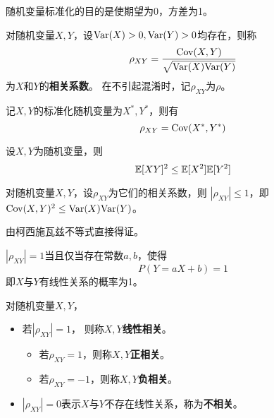 \begin{remark}
  随机变量标准化的目的是使期望为0，方差为1。
\end{remark}

\begin{definition}[相关系数]
  对随机变量$X,Y$，设$\textrm{Var}(X)>0,\textrm{Var}(Y)>0$均存在，则称
  \begin{displaymath}
    \rho_{XY}=\frac{\textrm{Cov}(X,Y)}{\sqrt{\textrm{Var}(X)\textrm{Var}(Y)}}
  \end{displaymath}
  为$X$和$Y$的\textbf{相关系数}。
  在不引起混淆时，记$\rho_{XY}$为$\rho$。  
\end{definition}

\begin{remark}
  记$X,Y$的标准化随机变量为$X^*,Y^*$，则有
  \begin{displaymath}
    \rho_{XY}=\textrm{Cov}(X^*,Y^*)
  \end{displaymath}
\end{remark}

\begin{theorem}
  设$X,Y$为随机变量，则
  \begin{displaymath}
    \mathbb{E}[XY]^2 \le \mathbb{E}[X^2]\mathbb{E}[Y^2]
  \end{displaymath}
\end{theorem}

\begin{theorem}[相关系数的性质]
  对随机变量$X,Y$，设$\rho_{XY}$为它们的相关系数，则
  $|\rho_{XY}|\le 1$，即$\textrm{Cov}(X,Y)^2 \le \textrm{Var}(X)\textrm{Var}(Y)$。
\end{theorem}

\begin{remark}
  由柯西施瓦兹不等式直接得证。
\end{remark}

\begin{theorem}
  $|\rho_{XY}|=1$当且仅当存在常数$a,b$，使得
  \[ P(Y=aX+b) = 1 \]
  即$X$与$Y$有线性关系的概率为1。
\end{theorem}

\begin{theorem}[相关性]
  对随机变量$X,Y$，
  \begin{itemize}
    \item
    若$|\rho_{XY}|=1$，
    则称$X,Y$\textbf{线性相关}。
    \begin{itemize}
      \item 
      若$\rho_{XY}=1$，则称$X,Y$\textbf{正相关}。
      \item 
      若$\rho_{XY}=-1$，则称$X,Y$\textbf{负相关}。
    \end{itemize}
    \item 
    $|\rho_{XY}|=0$表示$X$与$Y$不存在线性关系，称为\textbf{不相关}。
  \end{itemize}
\end{theorem}

